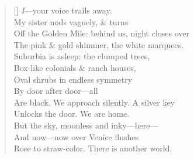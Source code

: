 \begin{verse}[\versewidth]
\textit{I}---your voice trails away.\\
My sister nods vaguely, \& turns\\
Off the Golden Mile: behind us, night closes over\\
The pink \& gold shimmer, the white marquees.\\
Suburbia is asleep: the clumped trees,\\
Box-like colonials \& ranch houses,\\
Oval shrubs in endless symmetry\\
By door after door---all\\
Are black. We approach silently. A silver key\\
Unlocks the door.  We are home.\\
But the sky, moonless and inky---here---\\
And now---now over Venice flushes\\
Rose to straw-color. There is another world.
\end{verse}
